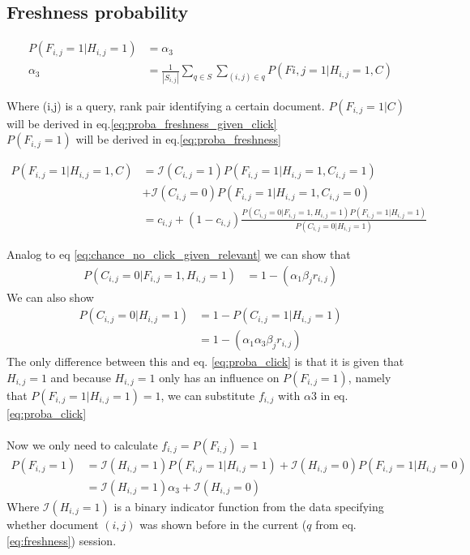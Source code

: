 \subsection{Freshness probability}
\begin{align}
P(F_{i,j} = 1 | H_{i,j} = 1) &= \alpha_3  \nonumber\\
\alpha_3 &= \frac{1}{|S_{i,j}|} \sum_{q \in S} \sum_{(i,j) \in q} P(F{i,j}=1 | H_{i,j}=1, C) \label{eq:freshness}
\end{align}

Where (i,j) is a query, rank pair identifying a certain document.
$P(F_{i,j}=1 | C)$ will be derived in eq.\ref{eq:proba_freshness_given_click} \\
$P(F_{i,j}=1)$ will be derived in eq.\ref{eq:proba_freshness}

\begin{align}
\label{eq:proba_freshness_given_click}
P(F_{i,j}=1 | H_{i,j}=1, C)
&= \mathcal{I}(C_{i,j} = 1) P(F_{i,j}=1|H_{i,j}=1,C_{i,j}=1) \\
&+ \mathcal{I}(C_{i,j} = 0) P(F_{i,j}=1|H_{i,j}=1,C_{i,j}=0)  \nonumber\\
&= c_{i,j} + (1-c_{i,j}) \frac {P(C_{i,j}=0|F_{i,j}=1,H_{i,j}=1) P(F_{i,j} = 1 | H_{i,j}=1)} {P(C_{i,j} = 0 | H_{i,j} = 1)}  \nonumber
\end{align}

Analog to eq \ref{eq:chance_no_click_given_relevant} we can show that
\begin{align}
P(C_{i,j}=0|F_{i,j}=1, H_{i,j}=1) &= 1 - (\alpha_1 \beta_j r_{i,j})
\label{eq:no_click_freshness}
\end{align}
We can also show
\begin{align}
P(C_{i,j}=0|H_{i,j}=1) 
&= 1 - P(C_{i,j}=1|H_{i,j}=1)  \nonumber\\
&= 1-(\alpha_1 \alpha_3 \beta_j r_{i,j})  \nonumber
\end{align}
The only difference between this and eq.  \ref{eq:proba_click} is that it is given that $H_{i,j}=1$ and because $H_{i,j} = 1$ only has an influence on $P(F_{i,j}=1)$, namely that $P(F_{i,j}=1 | H_{i,j} = 1) = 1$, we can substitute $f_{i,j}$ with $\alpha3$ in eq. \ref{eq:proba_click}\\
\\
Now we only need to calculate $f_{i,j} = P(F_{i,j}) = 1$
\begin{align}
\label{eq:proba_freshness}
P(F_{i,j} = 1)
&= \mathcal{I}(H_{i,j}=1) P(F_{i,j}=1|H_{i,j}=1) + \mathcal{I}(H_{i,j}=0) P(F_{i,j}=1|H_{i,j}=0)  \nonumber\\
&= \mathcal{I}(H_{i,j}=1) \alpha_3 + \mathcal{I}(H_{i,j}=0)  \nonumber
\end{align}
Where $\mathcal{I}(H_{i,j}=1)$ is a binary indicator function from the data specifying whether document $(i,j)$ was shown before in the current ($q$ from eq. \ref{eq:freshness}) session.\\

